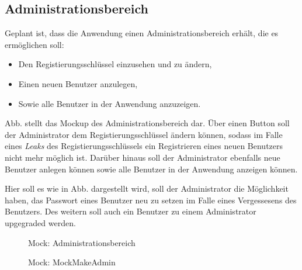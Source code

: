 
\subsection{Administrationsbereich}
\label{ssec:Administrationsbereich}

Geplant ist, dass die Anwendung einen Administrationsbereich erhält, die es ermöglichen soll: 
\begin{itemize}
    \item Den Registierungsschlüssel einzusehen und zu ändern,
    \item Einen neuen Benutzer anzulegen,
    \item Sowie alle Benutzer in der Anwendung anzuzeigen. 
\end{itemize}

Abb.  stellt das Mockup des Administrationsbereich dar. 
Über einen Button soll der Administrator dem Registierungsschlüssel ändern können, sodass im Falle eines \emph{Leaks} des Registierungsschlüssels ein Registrieren eines neuen Benutzers nicht mehr möglich ist. 
Darüber hinaus soll der Administrator ebenfalls neue Benutzer anlegen können sowie alle Benutzer in der Anwendung anzeigen können. 

Hier soll es wie in Abb.  dargestellt wird, soll der Administrator die Möglichkeit haben, das Passwort eines Benutzer neu zu setzen im Falle eines Vergessesens des Benutzers.
Des weitern soll auch ein Benutzer zu einem Administrator upgegraded werden. 

\begin{figure}
	\caption[Mock: Administrationsbereich]{Mock: Administrationsbereich \\ \quelle}
	\label{fig:MockAdministrationsbereich}
\end{figure}

\begin{figure}
	\caption[Mock: MockMakeAdmin]{Mock: MockMakeAdmin \\ \quelle}
	\label{fig:MockMakeAdmin}
\end{figure}